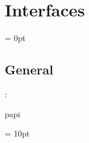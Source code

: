 
\section{Interfaces} 


\parskip = 0pt

\vspace{3mm} \subsection*{General}

: 

papi
\vspace{2mm}

\vspace{5mm}\parskip = 10pt 
